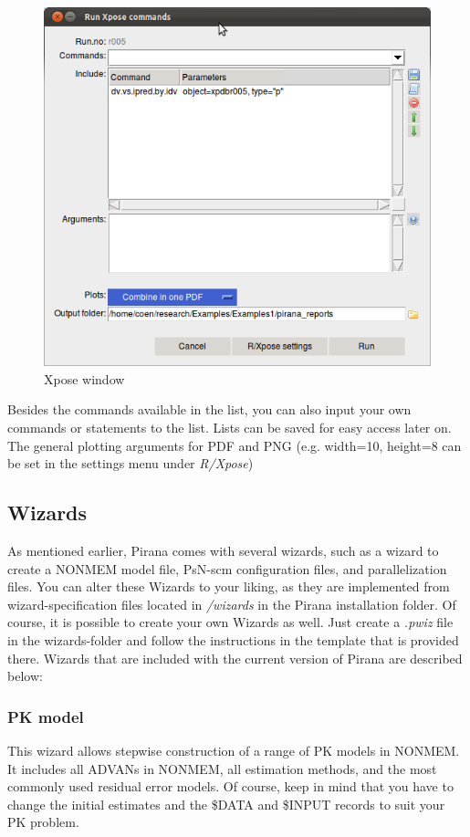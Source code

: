 {{{{\begin{figure}[H] \centering
    \includegraphics[scale=0.5]{images/xposewindow.png}
    \caption{Xpose window}
\end{figure}

\noindent Besides the commands available in the list, you can also input your
own commands or statements to the list. Lists can be saved for easy
access later on. The general plotting arguments for PDF and PNG
(e.g. {\ttfamily width=10, height=8} can be set in the settings menu
under \textit{R/Xpose})

\subsection{Wizards}
As mentioned earlier, Pirana comes with several wizards, such as a
wizard to create a NONMEM model file, PsN-scm configuration files, and
parallelization files. You can alter these Wizards to your liking, as they are
implemented from wizard-specification files located in
\textit{/wizards} in the Pirana installation folder. Of course, it
is possible to create your own Wizards as well. Just create a
\textit{.pwiz} file in the wizards-folder and follow the instructions
in the template that is provided there. Wizards that are included with
the current version of Pirana are described below:

\subsubsection*{PK model}
This wizard allows stepwise construction of a range of PK models in
NONMEM. It includes all ADVANs in NONMEM, all estimation methods, and
the most commonly used residual error models. Of course, keep in mind
that you have to change the initial estimates and the \$DATA and
\$INPUT records to suit your PK problem.

}}}}
